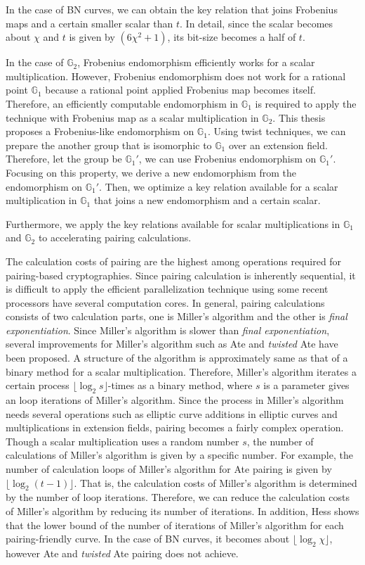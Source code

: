 In the case of BN curves, we can obtain the key relation that joins Frobenius maps and a certain smaller scalar than $t$.
In detail, since the scalar becomes about $\chi$ and $t$ is given by $(6\chi^2+1)$, its bit-size becomes a half of $t$.

In the case of $\mathbb{G}_2$, Frobenius endomorphism efficiently works for a scalar multiplication.
However, Frobenius endomorphism does not work for a rational point $\mathbb{G}_1$ because a rational point applied Frobenius map becomes itself.
Therefore, an efficiently computable endomorphism in $\mathbb{G}_1$ is required to apply the technique with Frobenius map as a scalar multiplication in $\mathbb{G}_2$.
This thesis proposes a Frobenius-like endomorphism on $\mathbb{G}_1$.
Using twist techniques, we can prepare the another group that is isomorphic to $\mathbb{G}_1$ over an extension field. 
Therefore, let the group be $\mathbb{G}_1'$, we can use Frobenius endomorphism on $\mathbb{G}_1'$.
Focusing on this property, we derive a new endomorphism from the endomorphism on $\mathbb{G}_1'$.
Then, we optimize a key relation available for a scalar multiplication in $\mathbb{G}_1$ that joins a new endomorphism and a certain scalar.

Furthermore, we apply the key relations available for scalar multiplications in $\mathbb{G}_1$ and $\mathbb{G}_2$ to accelerating pairing calculations.

The calculation costs of pairing are the highest among operations required for pairing-based cryptographies.
Since pairing calculation is inherently sequential, it is difficult to apply the efficient parallelization technique using some recent processors have several computation cores.
In general, pairing calculations consists of two calculation parts, one is Miller's algorithm and the other is {\it final exponentiation}.
Since Miller's algorithm is slower than {\it final exponentiation}, several improvements for Miller's algorithm such as Ate and {\it twisted} Ate have been proposed.
A structure of the algorithm is approximately same as that of a binary method for a scalar multiplication.
Therefore, Miller's algorithm iterates a certain process $\lfloor \log_2 s \rfloor$-times as a binary method, where $s$ is a parameter gives an loop iterations of Miller's algorithm.
Since the process in Miller's algorithm needs several operations such as elliptic curve additions in elliptic curves and multiplications in extension fields, pairing becomes a fairly complex operation. 
Though a scalar multiplication uses a random number $s$, the number of calculations of Miller's algorithm is given by a specific number.
For example, the number of calculation loops of Miller's algorithm for Ate pairing is given by $\lfloor \log_2 (t-1) \rfloor$.
That is, the calculation costs of Miller's algorithm is determined by the number of loop iterations.
Therefore, we can reduce the calculation costs of Miller's algorithm by reducing its number of iterations.
In addition, Hess shows that the lower bound of the number of iterations of Miller's algorithm for each pairing-friendly curve.
In the case of BN curves, it becomes about $\lfloor \log_2 \chi \rfloor$, however Ate and {\it twisted} Ate pairing does not achieve.

